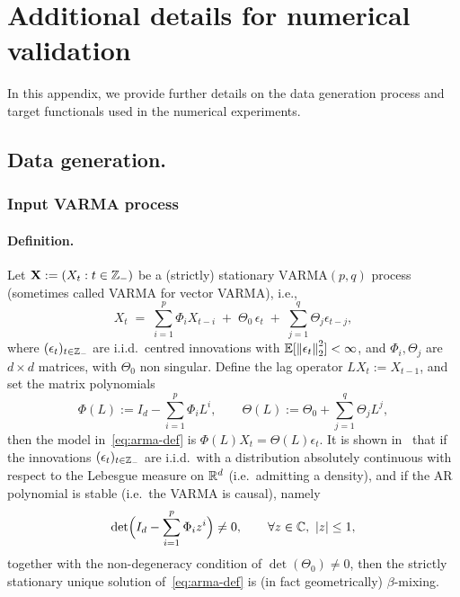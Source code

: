 \section{Additional details for numerical validation}
In this appendix, we provide further details on the data generation process and target functionals used in the numerical experiments.
\subsection{Data generation.}
\subsubsection{Input VARMA process}
\label{subsec:VARMA}
\paragraph{Definition.}
Let ${\mathbf{X}} := (X_t : t \in {\mathbb{Z}}_-)$ be a (strictly) stationary $\mathrm{VARMA}(p,q)$ process (sometimes called VARMA for vector VARMA), i.e.,
\begin{equation}\label{eq:arma-def}
    X_t \;=\; \sum_{i=1}^p \Phi_i X_{t-i} \;+\; \Theta_0 \, \epsilon_t \;+\; \sum_{j=1}^q \Theta_j \epsilon_{t-j},
\end{equation}
where $(\epsilon_t)_{t\in{\mathbb{Z}}_-}$ are i.i.d.\ centred innovations with $\mathbb{E}[\left\lVert\epsilon_t\right\rVert_{2}^2]<\infty$, and $\Phi_i, \Theta_j$ are $d \times d$ matrices, with $\Theta_0$ non singular. Define the lag operator $L X_t := X_{t-1}$, and set the matrix polynomials
\[
\Phi(L) := I_d - \sum_{i=1}^p \Phi_i L^i, \qquad \Theta(L) := \Theta_0 + \sum_{j=1}^q \Theta_j L^j,
\]
then the model in~\cref{eq:arma-def} is $\Phi(L) X_t = \Theta(L) \epsilon_t$. It is shown in~\cite{mokkadem1988mixing} that if the innovations $(\epsilon_t)_{t\in{\mathbb{Z}}_-}$ are i.i.d.\ with a distribution
absolutely continuous with respect to the Lebesgue measure on $\mathbb{R}^d$ (i.e.\ admitting a density), and if the AR polynomial is stable
(i.e.\ the VARMA is causal), namely
\begin{equation}\label{eq:arma-stability}
\det\!\Big(I_d-\sum_{i=1}^p \Phi_i z^i\Big)\neq 0,\qquad \forall z\in{\mathbb{C}},\ |z|\le 1,
\end{equation}
together with the non-degeneracy condition of $\det(\Theta_0)\neq 0$,
then the strictly stationary unique solution of~\cref{eq:arma-def} is (in fact geometrically) $\beta$-mixing.

